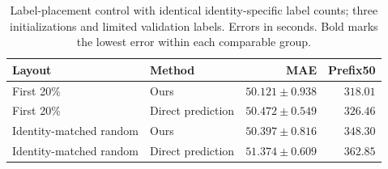 \begin{table}[t]
\centering\footnotesize\setlength{\tabcolsep}{4pt}
\caption{Label-placement control with identical identity-specific label counts; three initializations and limited validation labels. Errors in seconds. Bold marks the lowest error within each comparable group.}\label{tab:controlled_coverage}
\begin{tabular}{llrr}\toprule
Layout & Method & MAE & Prefix50\\\midrule
First 20\% & Ours & $\mathbf{50.121\pm0.938}$ & $\mathbf{318.01}$\\
First 20\% & Direct prediction & $50.472\pm0.549$ & $326.46$\\
Identity-matched random & Ours & $\mathbf{50.397\pm0.816}$ & $\mathbf{348.30}$\\
Identity-matched random & Direct prediction & $51.374\pm0.609$ & $362.85$\\
\bottomrule\end{tabular}
\end{table}

